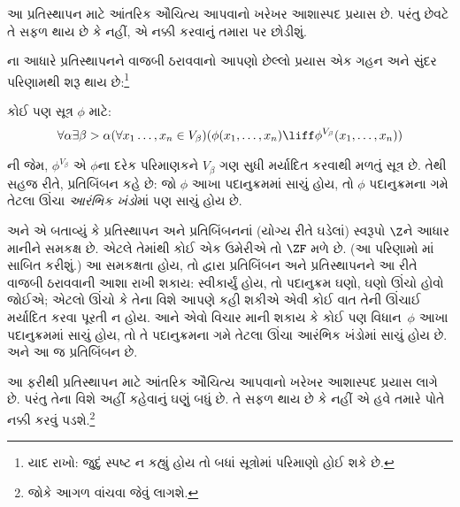 આ પ્રતિસ્થાપન માટે આંતરિક ઔચિત્ય આપવાનો ખરેખર
આશાસ્પદ પ્રયાસ છે. પરંતુ છેવટે તે સફળ થાય છે કે
નહીં, એ નક્કી કરવાનું તમારા પર છોડીશું.
\endgroup

\begingroup
\makeatletter{}\makeatother

\label{guunit:OLP-0571}


\stagesinex{}ના આધારે પ્રતિસ્થાપનને વાજબી ઠરાવવાનો
આપણો છેલ્લો પ્રયાસ એક ગહન અને સુંદર પરિણામથી
શરૂ થાય છે:\footnote{યાદ રાખો: જુદું સ્પષ્ટ ન કહ્યું હોય
તો બધાં સૂત્રોમાં પરિમાણો હોઈ શકે છે.}
\begin{thm}[પ્રતિબિંબનનું પ્રરૂપ]
કોઈ પણ સૂત્ર $\phi$ માટે:
\[
\forall \alpha \exists \beta > \alpha (\forall x_1 \ldots, x_n \in
V_\beta)(\phi(x_1, \ldots, x_n) \liff \phi^{V_\beta}(x_1, \ldots, x_n))
\]
\end{thm}
\noindent
{}ની જેમ,
$\phi^{V_\beta}$ એ $\phi$ના દરેક પરિમાણકને
$V_\beta$ ગણ સુધી મર્યાદિત કરવાથી મળતું સૂત્ર છે.
તેથી સહજ રીતે, પ્રતિબિંબન કહે છે: જો $\phi$ આખા
પદાનુક્રમમાં સાચું હોય, તો $\phi$ પદાનુક્રમના ગમે તેટલા
ઊંચા \emph{આરંભિક ખંડો}માં પણ સાચું હોય છે.

\citet{Montague1961} અને \citet{Levy1960}એ બતાવ્યું
કે પ્રતિસ્થાપન અને પ્રતિબિંબનનાં (યોગ્ય રીતે ઘડેલાં)
સ્વરૂપો $\Z$ને આધાર માનીને સમકક્ષ છે. એટલે તેમાંથી
કોઈ એક ઉમેરીએ તો $\ZF$ મળે છે. (આ પરિણામો
માં સાબિત કરીશું.)
આ સમકક્ષતા હોય, તો \stagesinex{} દ્વારા પ્રતિબિંબન અને
પ્રતિસ્થાપનને આ રીતે વાજબી ઠરાવવાની આશા રાખી શકાય:
\stagesinex{} સ્વીકાર્યું હોય, તો પદાનુક્રમ ઘણો, ઘણો
ઊંચો હોવો જોઈએ; એટલો ઊંચો કે તેના વિશે આપણે કહી
શકીએ એવી કોઈ વાત તેની ઊંચાઈ મર્યાદિત કરવા પૂરતી ન હોય.
આને એવો વિચાર માની શકાય કે કોઈ પણ વિધાન~$\phi$
આખા પદાનુક્રમમાં સાચું હોય, તો તે પદાનુક્રમના ગમે
તેટલા ઊંચા આરંભિક ખંડોમાં સાચું હોય છે. અને આ જ
પ્રતિબિંબન છે.

આ ફરીથી પ્રતિસ્થાપન માટે આંતરિક ઔચિત્ય આપવાનો
ખરેખર આશાસ્પદ પ્રયાસ લાગે છે. પરંતુ તેના વિશે અહીં
કહેવાનું ઘણું બધું છે. તે સફળ થાય છે કે નહીં એ હવે
તમારે પોતે નક્કી કરવું પડશે.\footnote{જોકે આગળ
\citet[95--100]{Incurvati2020} વાંચવા જેવું લાગશે.}
\endgroup

\begingroup
\makeatletter{}\makeatother

\label{guunit:OLP-0572}


